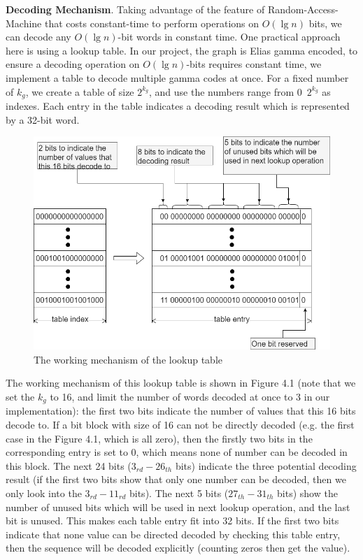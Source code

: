 \documentclass[12pt,glossary]{dalthesis}
\begin{document}
\bigskip
\bigskip

\textbf{Decoding Mechanism}. Taking advantage of the feature of Random-Access-Machine that costs constant-time to perform operations on $O(\lg n)$ bits, we can decode any $O(\lg n)$-bit words in constant time. One practical approach here is using a lookup table. In our project, the graph is Elias gamma encoded, to ensure a decoding operation on $O(\lg n)$-bits requires constant time, we implement a table to decode multiple gamma codes at once. For a fixed number of $k_{g}$, we create a table of size $2^{k_{g}}$, and use the numbers range from 0~$2^{k_{g}}$ as indexes. Each entry in the table indicates a decoding result which is represented by a 32-bit word.  

\bigskip

\begin{figure}[ht]
\centering
\includegraphics[width=1.0\textwidth]{Decoding}
\caption{The working mechanism of the lookup table}
\end{figure}

\bigskip

The working mechanism of this lookup table is shown in Figure 4.1 (note that we set the $k_{g}$ to 16, and limit the number of words decoded at once to 3 in our implementation): the first two bits indicate the number of values that this 16 bits decode to. If a bit block with size of 16 can not be directly decoded (e.g. the first case in the Figure 4.1, which is all zero), then the firstly two bits in the corresponding entry is set to 0, which means none of number can be decoded in this block. The next 24 bits ($3_{rd} - 26_{th}$ bits) indicate the three potential decoding result (if the first two bits show that only one number can be decoded, then we only look into the $3_{rd} - 11_{rd}$ bits). The next 5 bits ($27_{th} - 31_{th}$ bits) show the number of unused bits which will be used in next lookup operation, and the last bit is unused. This makes each table entry fit into 32 bits. If the first two bits indicate that none value can be directed decoded by checking this table entry, then the sequence will be decoded explicitly (counting zeros then get the value).
\end{document}

